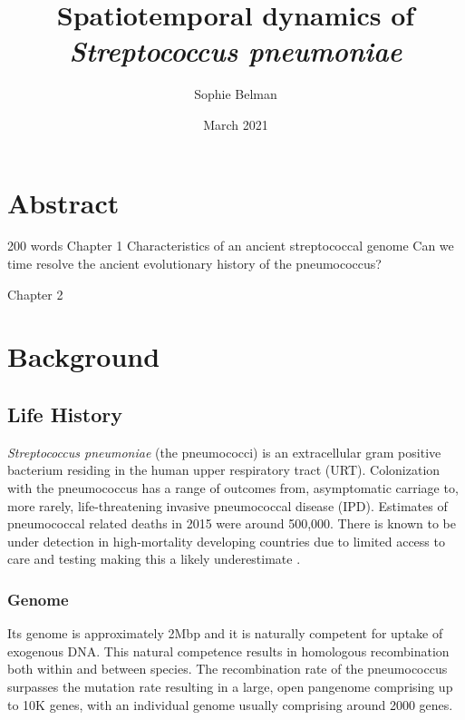 \documentclass{article}
\title{Spatiotemporal dynamics of \textit{Streptococcus pneumoniae}}
\author{Sophie Belman}
\date{March 2021}
\begin{document}
\maketitle

\section{Abstract}
200 words
Chapter 1
Characteristics of an ancient streptococcal genome
Can we time resolve the ancient evolutionary history of the pneumococcus?

Chapter 2

\section{Background}
\subsection{Life History}
\textit{Streptococcus pneumoniae} (the pneumococci) is an extracellular gram positive bacterium residing in the human upper respiratory tract (URT). Colonization with the pneumococcus has a range of outcomes from, asymptomatic carriage to, more rarely, life-threatening invasive pneumococcal disease (IPD)\cite{weiserStreptococcusPneumoniaeTransmission2018}. Estimates of pneumococcal related deaths in 2015 were around 500,000\cite{wahlBurdenStreptococcusPneumoniae2018}. There is known to be under detection in high-mortality developing countries due to limited access to care and testing making this a likely underestimate \cite{obrienBurdenDiseaseCaused2009,troegerEstimatesGlobalRegional2017}. 
\subsubsection{Genome}
Its genome is approximately 2Mbp and it is naturally competent for uptake of exogenous DNA. This natural competence results in homologous recombination both within and between species. The recombination rate of the pneumococcus surpasses the mutation rate resulting in a large, open pangenome comprising up to 10K genes, with an individual genome usually comprising around 2000 genes.  
\end{document}
